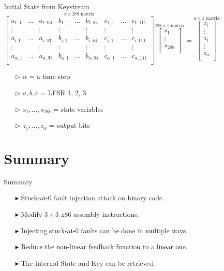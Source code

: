 \documentclass[10pt, compress]{beamer}
\begin{document}
\begin{frame}{Initial State from Keystream}
\mbox{\scriptsize
${\displaystyle {\overset {\alpha\times 288{\text{ matrix}}}
{\begin{bmatrix}
a_{1,1}& \dots & a_{1,93} & b_{1,1} & \dots & b_{1,84} & c_{1,1} & \dots & c_{1,111}\\
\vdots &  & \vdots & \vdots &  & \vdots & \vdots &  & \vdots\\
a_{i,1}& \dots & a_{i,93} & b_{i,1} & \dots & b_{i,84} & c_{i,1} & \dots & c_{i,111}\\
\vdots &  & \vdots & \vdots &  & \vdots & \vdots &  & \vdots\\
a_{\alpha,1}& \dots & a_{\alpha,93} & b_{\alpha,1} & \dots & b_{\alpha,84} & c_{\alpha,1} & \dots & c_{\alpha,111}\\
\end{bmatrix}}}
{\overset {288\times 1{\text{ matrix}}}
{\begin{bmatrix}
s_{1} \\
\vdots \\
s_{288} \\
\end{bmatrix}}}
=
{\overset {\alpha\times 1{\text{ matrix}}}
{\begin{bmatrix}
z_{1} \\
\vdots \\
z_{i} \\
\vdots \\
z_{\alpha} \\
\end{bmatrix}}}}
$}

\begin{itemize}[itemsep=0.25cm]
\item[$\triangleright$] $\alpha$ = a time step
\item[$\triangleright$] $a, b, c$ = LFSR 1, 2, 3
\item[$\triangleright$] $s_1,...,s_{288}$ = state variables
\item[$\triangleright$] $z_1,...,z_{\alpha}$ = output bits
\end{itemize}
\end{frame}

\section{Summary}

\begin{frame}{Summary}
\begin{itemize}[itemsep=0.5cm]
\item[$\blacktriangleright$] Stuck-at-0 fault injection attack on binary code.
\item[$\blacktriangleright$] Modify $3 \times 3$ x86 assembly instructions.
\item[$\blacktriangleright$] Injecting stuck-at-0 faults can be done in multiple ways.
\item[$\blacktriangleright$] Reduce the non-linear feedback function to a linear one.
\item[$\blacktriangleright$] The Internal State and Key can be retrieved. 
\end{itemize}
\end{frame}
\end{document}
